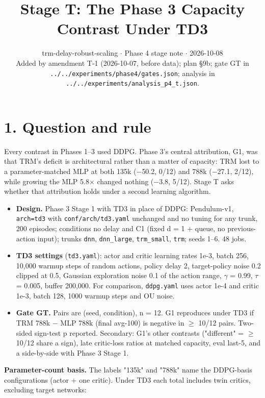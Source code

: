 \documentclass[11pt]{article}
\title{Stage T: The Phase 3 Capacity Contrast Under TD3}
\author{}
\date{trm-delay-robust-scaling $\cdot$ Phase 4 stage note $\cdot$ 2026-10-08\\[2pt]Added by amendment T-1 (2026-10-07, before data); plan \S{}9b; gate GT in \texttt{.\allowbreak{}.\allowbreak{}/\allowbreak{}.\allowbreak{}.\allowbreak{}/\allowbreak{}experiments/\allowbreak{}phase4/\allowbreak{}gates.\allowbreak{}json}; analysis in \texttt{.\allowbreak{}.\allowbreak{}/\allowbreak{}.\allowbreak{}.\allowbreak{}/\allowbreak{}experiments/\allowbreak{}analysis\_\allowbreak{}p4\_\allowbreak{}t.\allowbreak{}json}.}
\begin{document}
\maketitle
\section*{1. Question and rule}



Every contrast in Phases 1--3 used DDPG. Phase 3's central attribution, G1, was that TRM's deficit is architectural rather than a matter of capacity: TRM lost to a parameter-matched MLP at both 135k ($-$50.2, 0/12) and 788k ($-$27.1, 2/12), while growing the MLP 5.8$\times$ changed nothing ($-$3.8, 5/12). Stage T asks whether that attribution holds under a second learning algorithm.



\begin{itemize}
\item \textbf{Design.} Phase 3 Stage 1 with TD3 in place of DDPG: Pendulum-v1, \texttt{arch=td3} with \texttt{conf/\allowbreak{}arch/\allowbreak{}td3.\allowbreak{}yaml} unchanged and no tuning for any trunk, 200 episodes; conditions no delay and C1 (fixed d = 1 + queue, no previous-action input); trunks \texttt{dnn}, \texttt{dnn\_large}, \texttt{trm\_small}, \texttt{trm}; seeds 1--6. 48 jobs.
\item \textbf{TD3 settings} (\texttt{td3.yaml}): actor and critic learning rates 1e-3, batch 256, 10,000 warmup steps of random actions, policy delay 2, target-policy noise 0.2 clipped at 0.5, Gaussian exploration noise 0.1 of the action range, $\gamma$ = 0.99, $\tau$ = 0.005, buffer 200,000. For comparison, \texttt{ddpg.yaml} uses actor 1e-4 and critic 1e-3, batch 128, 1000 warmup steps and OU noise.
\item \textbf{Gate GT.} Pairs are (seed, condition), n = 12. G1 reproduces under TD3 if TRM 788k $-$ MLP 788k (final avg-100) is negative in $\geq$ 10/12 pairs. Two-sided sign-test p reported. Secondary: G1's other contrasts ("different" = $\geq$ 10/12 share a sign), late critic-loss ratios at matched capacity, eval last-5, and a side-by-side with Phase 3 Stage 1.
\end{itemize}



\textbf{Parameter-count basis.} The labels "135k" and "788k" name the DDPG-basis configurations (actor + one critic). Under TD3 each total includes twin critics, excluding target networks:
\end{document}
